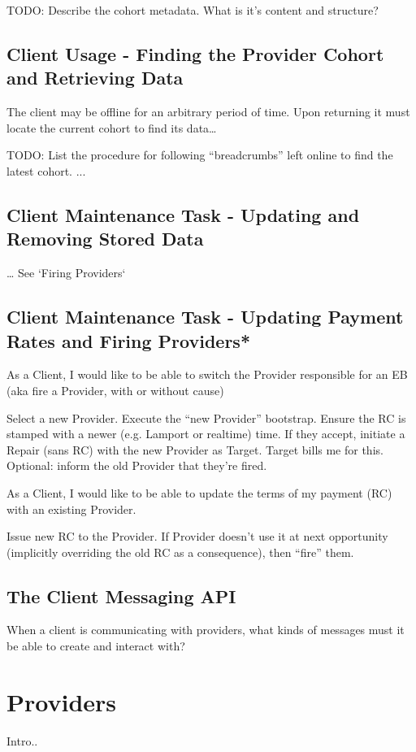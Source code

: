 \documentclass{article}
\begin{document}
TODO: Describe the cohort metadata.  What is it’s content and structure?

\subsection{Client Usage - Finding the Provider Cohort and Retrieving Data}

The client may be offline for an arbitrary period of time.  Upon returning it must locate the current cohort to find its data…

TODO: List the procedure for following “breadcrumbs” left online to find the latest cohort.
...

\subsection{Client Maintenance Task - Updating and Removing Stored Data}
… 
See `Firing Providers`

\subsection{Client Maintenance Task - Updating Payment Rates and Firing Providers*}
As a Client, I would like to be able to switch the Provider responsible for an EB (aka fire a Provider, with or without cause)

Select a new Provider. Execute the “new Provider” bootstrap. Ensure the RC is stamped with a newer (e.g. Lamport or realtime) time. 
If they accept, initiate a Repair (sans RC) with the new Provider as Target. Target bills me for this. Optional: inform the old Provider that they’re fired.


As a Client, I would like to be able to update the terms of my payment (RC) with an existing Provider.

Issue new RC to the Provider. If Provider doesn’t use it at next opportunity (implicitly overriding the old RC as a consequence), then “fire” them.

\subsection{The Client Messaging API}
When a client is communicating with providers, what kinds of messages must it be able to create and interact with?


\section{Providers}
Intro..
\end{document}
